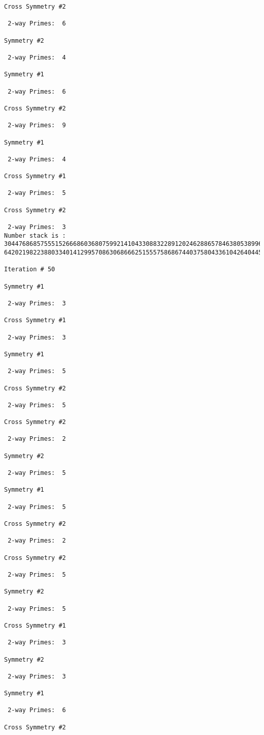\begin{verbatim}
Cross Symmetry #2

 2-way Primes: 	6

Symmetry #2

 2-way Primes: 	4

Symmetry #1

 2-way Primes: 	6

Cross Symmetry #2

 2-way Primes: 	9

Symmetry #1

 2-way Primes: 	4

Cross Symmetry #1

 2-way Primes: 	5

Cross Symmetry #2

 2-way Primes: 	3
Number stack is :
30447686857555152666860368075992141043308832289120246288657846380538996794608835958544046240163340857
64202198223880334014129957086306866625155575868674403758043361042640445859538806497699835083648756882

Iteration #	50

Symmetry #1

 2-way Primes: 	3

Cross Symmetry #1

 2-way Primes: 	3

Symmetry #1

 2-way Primes: 	5

Cross Symmetry #2

 2-way Primes: 	5

Cross Symmetry #2

 2-way Primes: 	2

Symmetry #2

 2-way Primes: 	5

Symmetry #1

 2-way Primes: 	5

Cross Symmetry #2

 2-way Primes: 	2

Cross Symmetry #2

 2-way Primes: 	5

Symmetry #2

 2-way Primes: 	5

Cross Symmetry #1

 2-way Primes: 	3

Symmetry #2

 2-way Primes: 	3

Symmetry #1

 2-way Primes: 	6

Cross Symmetry #2


\end{verbatim}
